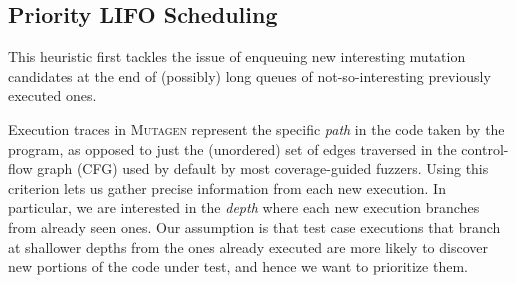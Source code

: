 \documentclass[sigconf,review,anonymous]{acmart}
\newcommand{\fuzzchick}{\textit{FuzzChick}\xspace}
\newcommand{\mutagen}{\textsc{Mutagen}\xspace}
\begin{document}
\subsection{Priority LIFO Scheduling}

This heuristic first tackles the issue of enqueuing new interesting mutation
candidates at the end of (possibly) long queues of not-so-interesting previously
executed ones.

Execution traces in \mutagen represent the specific \emph{path} in the code
taken by the program, as opposed to just the (unordered) set of edges traversed
in the control-flow graph (CFG) used by default by most coverage-guided fuzzers.
%
Using this criterion lets us gather precise information from each new execution.
%
In particular, we are interested in the \emph{depth} where each new execution
branches from already seen ones.
%
Our assumption is that test case executions that branch at shallower depths from
the ones already executed are more likely to discover new portions of the code
under test, and hence we want to prioritize them.
\end{document}
